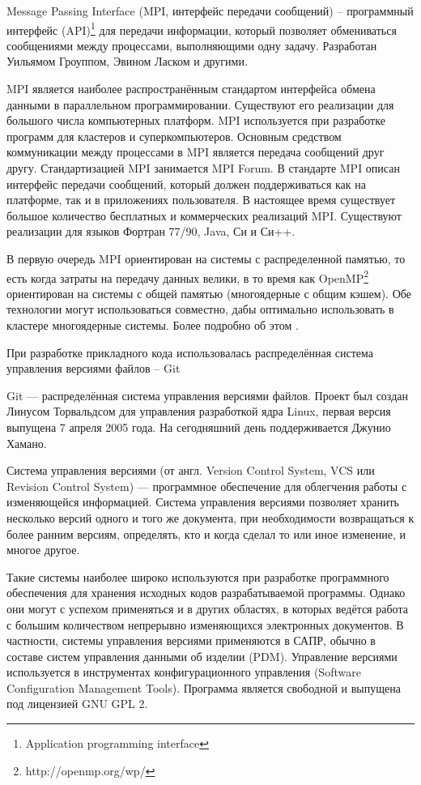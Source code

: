 Message Passing Interface (MPI, интерфейс передачи сообщений) -- программный интерфейс (API)\footnote{Application programming interface} для передачи информации, который позволяет обмениваться сообщениями между процессами, выполняющими одну задачу. Разработан Уильямом Гроуппом, Эвином Ласком и другими.

MPI является наиболее распространённым стандартом интерфейса обмена данными в параллельном программировании. Существуют его реализации для большого числа компьютерных платформ. MPI используется при разработке программ для кластеров и суперкомпьютеров. Основным средством коммуникации между процессами в MPI является передача сообщений друг другу. Стандартизацией MPI занимается MPI Forum. В стандарте MPI описан интерфейс передачи сообщений, который должен поддерживаться как на платформе, так и в приложениях пользователя. В настоящее время существует большое количество бесплатных и коммерческих реализаций MPI. Существуют реализации для языков Фортран 77/90, Java, Си и Си++.

В первую очередь MPI ориентирован на системы с распределенной памятью, то есть когда затраты на передачу данных велики, в то время как OpenMP\footnote{http://openmp.org/wp/} ориентирован на системы с общей памятью (многоядерные с общим кэшем). Обе технологии могут использоваться совместно, дабы оптимально использовать в кластере многоядерные системы. Более подробно об этом \cite{mpi:offsite}.

При разработке прикладного кода использовалась распределённая система управления версиями файлов -- Git

Git — распределённая система управления версиями файлов. Проект был создан Линусом Торвальдсом для управления разработкой ядра Linux, первая версия выпущена 7 апреля 2005 года. На сегодняшний день поддерживается Джунио Хамано.

Система управления версиями (от англ. Version Control System, VCS или Revision Control System) — программное обеспечение для облегчения работы с изменяющейся информацией. Система управления версиями позволяет хранить несколько версий одного и того же документа, при необходимости возвращаться к более ранним версиям, определять, кто и когда сделал то или иное изменение, и многое другое.

Такие системы наиболее широко используются при разработке программного обеспечения для хранения исходных кодов разрабатываемой программы. Однако они могут с успехом применяться и в других областях, в которых ведётся работа с большим количеством непрерывно изменяющихся электронных документов. В частности, системы управления версиями применяются в САПР, обычно в составе систем управления данными об изделии (PDM). Управление версиями используется в инструментах конфигурационного управления (Software Configuration Management Tools).
Программа является свободной и выпущена под лицензией GNU GPL 2.

